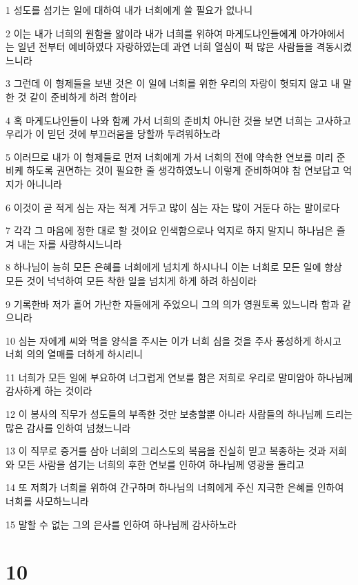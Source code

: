 \par 1 성도를 섬기는 일에 대하여 내가 너희에게 쓸 필요가 없나니
\par 2 이는 내가 너희의 원함을 앎이라 내가 너희를 위하여 마게도냐인들에게 아가야에서는 일년 전부터 예비하였다 자랑하였는데 과연 너희 열심이 퍽 많은 사람들을 격동시켰느니라
\par 3 그런데 이 형제들을 보낸 것은 이 일에 너희를 위한 우리의 자랑이 헛되지 않고 내 말한 것 같이 준비하게 하려 함이라
\par 4 혹 마게도냐인들이 나와 함께 가서 너희의 준비치 아니한 것을 보면 너희는 고사하고 우리가 이 믿던 것에 부끄러움을 당할까 두려워하노라
\par 5 이러므로 내가 이 형제들로 먼저 너희에게 가서 너희의 전에 약속한 연보를 미리 준비케 하도록 권면하는 것이 필요한 줄 생각하였노니 이렇게 준비하여야 참 연보답고 억지가 아니니라
\par 6 이것이 곧 적게 심는 자는 적게 거두고 많이 심는 자는 많이 거둔다 하는 말이로다
\par 7 각각 그 마음에 정한 대로 할 것이요 인색함으로나 억지로 하지 말지니 하나님은 즐겨 내는 자를 사랑하시느니라
\par 8 하나님이 능히 모든 은혜를 너희에게 넘치게 하시나니 이는 너희로 모든 일에 항상 모든 것이 넉넉하여 모든 착한 일을 넘치게 하게 하려 하심이라
\par 9 기록한바 저가 흩어 가난한 자들에게 주었으니 그의 의가 영원토록 있느니라 함과 같으니라
\par 10 심는 자에게 씨와 먹을 양식을 주시는 이가 너희 심을 것을 주사 풍성하게 하시고 너희 의의 열매를 더하게 하시리니
\par 11 너희가 모든 일에 부요하여 너그럽게 연보를 함은 저희로 우리로 말미암아 하나님께 감사하게 하는 것이라
\par 12 이 봉사의 직무가 성도들의 부족한 것만 보충할뿐 아니라 사람들의 하나님께 드리는 많은 감사를 인하여 넘쳤느니라
\par 13 이 직무로 증거를 삼아 너희의 그리스도의 복음을 진실히 믿고 복종하는 것과 저희와 모든 사람을 섬기는 너희의 후한 연보를 인하여 하나님께 영광을 돌리고
\par 14 또 저희가 너희를 위하여 간구하며 하나님의 너희에게 주신 지극한 은혜를 인하여 너희를 사모하느니라
\par 15 말할 수 없는 그의 은사를 인하여 하나님께 감사하노라

\chapter{10}

